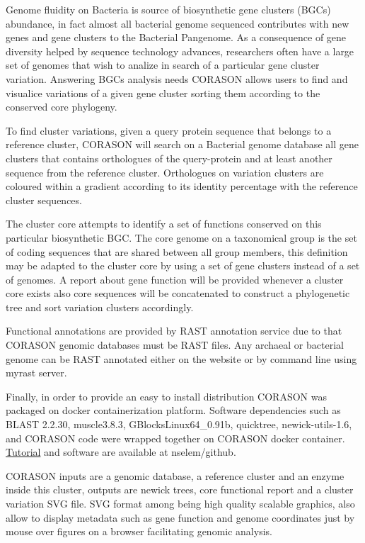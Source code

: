 \documentclass[12pt,twoside]{reedthesis}
\begin{document}
  Genome fluidity on Bacteria is source of biosynthetic gene clusters
  (BGCs) abundance, in fact almost all bacterial genome sequenced
  contributes with new genes and gene clusters to the Bacterial Pangenome.
  As a consequence of gene diversity helped by sequence technology
  advances, researchers often have a large set of genomes that wish to
  analize in search of a particular gene cluster variation. Answering BGCs
  analysis needs CORASON allows users to find and visualice variations of
  a given gene cluster sorting them according to the conserved core
  phylogeny.
  
  To find cluster variations, given a query protein sequence that belongs
  to a reference cluster, CORASON will search on a Bacterial genome
  database all gene clusters that contains orthologues of the
  query-protein and at least another sequence from the reference cluster.
  Orthologues on variation clusters are coloured within a gradient
  according to its identity percentage with the reference cluster
  sequences.
  
  The cluster core attempts to identify a set of functions conserved on
  this particular biosynthetic BGC. The core genome on a taxonomical group
  is the set of coding sequences that are shared between all group
  members, this definition may be adapted to the cluster core by using a
  set of gene clusters instead of a set of genomes. A report about gene
  function will be provided whenever a cluster core exists also core
  sequences will be concatenated to construct a phylogenetic tree and sort
  variation clusters accordingly.
  
  Functional annotations are provided by RAST annotation service due to
  that CORASON genomic databases must be RAST files. Any archaeal or
  bacterial genome can be RAST annotated either on the website or by
  command line using myrast server.
  
  Finally, in order to provide an easy to install distribution CORASON was
  packaged on docker containerization platform. Software dependencies such
  as BLAST 2.2.30, muscle3.8.3, GBlocksLinux64\_0.91b, quicktree,
  newick-utils-1.6, and CORASON code were wrapped together on CORASON
  docker container.
  \href{https://github.com/nselem/EvoDivMet/wiki}{Tutorial} and software
  are available at nselem/github.
  
  CORASON inputs are a genomic database, a reference cluster and an enzyme
  inside this cluster, outputs are newick trees, core functional report
  and a cluster variation SVG file. SVG format among being high quality
  scalable graphics, also allow to display metadata such as gene function
  and genome coordinates just by mouse over figures on a browser
  facilitating genomic analysis.
  
\end{document}
